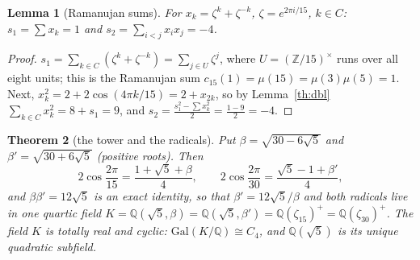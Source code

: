 \documentclass[11pt,a4paper]{article}
\theoremstyle{plain}
\newtheorem{theorem}{Theorem}
\newtheorem{lemma}[theorem]{Lemma}
\theoremstyle{definition}
\theoremstyle{remark}
\newcommand{\ZZ}{\mathbb{Z}}
\newcommand{\QQ}{\mathbb{Q}}
\begin{document}
\begin{lemma}[Ramanujan sums]\label{th:rams}
For $x_k=\zeta^k+\zeta^{-k}$, $\zeta=e^{2\pi i/15}$, $k\in C$:
$s_1=\sum x_k=1$ and $s_2=\sum_{i<j}x_ix_j=-4$.
\end{lemma}

\begin{proof}
$s_1=\sum_{k\in C}(\zeta^k+\zeta^{-k})=\sum_{j\in U}\zeta^j$,
where $U=(\ZZ/15)^\times$ runs over all eight units; this is the
Ramanujan sum $c_{15}(1)=\mu(15)=\mu(3)\mu(5)=1$. Next,
$x_k^2=2+2\cos(4\pi k/15)=2+x_{2k}$, so by
Lemma~\ref{th:dbl} $\sum_{k\in C}x_k^2=8+s_1=9$, and
$s_2=\frac{s_1^2-\sum x_k^2}{2}=\frac{1-9}{2}=-4$.
\end{proof}

\begin{theorem}[the tower and the radicals]\label{th:tower}
Put $\beta=\sqrt{30-6\sqrt5}$ and $\beta'=\sqrt{30+6\sqrt5}$
(positive roots). Then
\[
  2\cos\frac{2\pi}{15}=\frac{1+\sqrt5+\beta}{4},
  \qquad
  2\cos\frac{2\pi}{30}=\frac{\sqrt5-1+\beta'}{4},
\]
and $\beta\beta'=12\sqrt5$ is an exact identity, so that
$\beta'=12\sqrt5/\beta$ and both radicals live in \emph{one}
quartic field $K=\QQ(\sqrt5,\beta)=\QQ(\sqrt5,\beta')
=\QQ(\zeta_{15})^+=\QQ(\zeta_{30})^+$.
The field $K$ is totally real and cyclic:
$\mathrm{Gal}(K/\QQ)\cong C_4$, and $\QQ(\sqrt5)$ is its unique
quadratic subfield.
\end{theorem}
\end{document}

